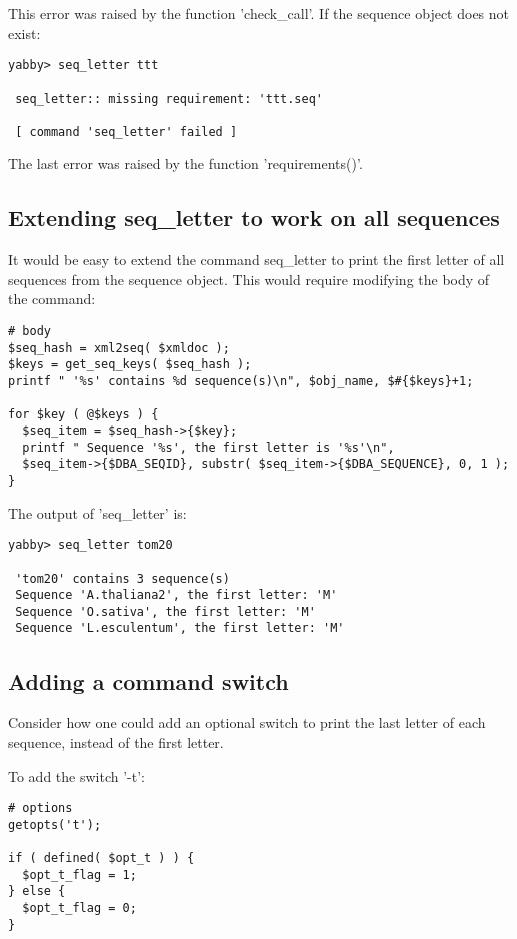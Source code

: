 This error was raised by the function 'check\_call'. If the sequence
object does not exist:

\begin{verbatim}
yabby> seq_letter ttt

 seq_letter:: missing requirement: 'ttt.seq'

 [ command 'seq_letter' failed ]
\end{verbatim}

The last error was raised by the function 'requirements()'.

\subsection{Extending seq\_letter to work on all sequences}

It would be easy to extend the command seq\_letter to print the
first letter of all sequences from the sequence object. This would
require modifying the body of the command:

\begin{verbatim}
# body
$seq_hash = xml2seq( $xmldoc );
$keys = get_seq_keys( $seq_hash );
printf " '%s' contains %d sequence(s)\n", $obj_name, $#{$keys}+1;

for $key ( @$keys ) {
  $seq_item = $seq_hash->{$key};
  printf " Sequence '%s', the first letter is '%s'\n",
  $seq_item->{$DBA_SEQID}, substr( $seq_item->{$DBA_SEQUENCE}, 0, 1 );
}
\end{verbatim}

The output of 'seq\_letter' is:

\begin{verbatim}
yabby> seq_letter tom20

 'tom20' contains 3 sequence(s)
 Sequence 'A.thaliana2', the first letter: 'M'
 Sequence 'O.sativa', the first letter: 'M'
 Sequence 'L.esculentum', the first letter: 'M'
\end{verbatim}

\subsection{Adding a command switch}

Consider how one could add an optional switch to print the last
letter of each sequence, instead of the first letter.

To add the switch '-t':

\begin{verbatim}
# options
getopts('t');

if ( defined( $opt_t ) ) {
  $opt_t_flag = 1;
} else {
  $opt_t_flag = 0;
}
\end{verbatim}

